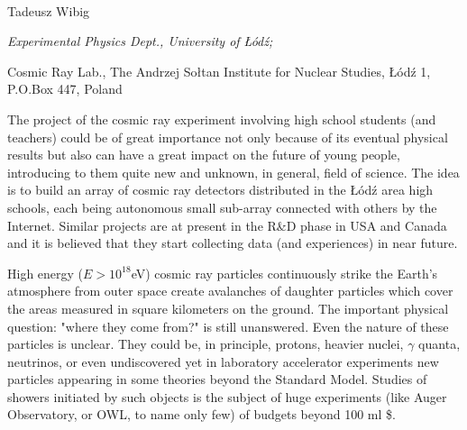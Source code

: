 \sloppy

\textheight 23cm
\textwidth 15cm
\leftmargin 4cm
\topmargin -1.5cm

\pagestyle{empty}

\begin{center}
 
\

\vspace{2cm}

{\huge Tadeusz Wibig}

 \vspace{1cm}
\noindent
{{\Large \it Experimental Physics Dept., University of \L \'{o}d\'{z}; 

\vspace{.3cm} \noindent
Cosmic Ray Lab.,  
The Andrzej So{\l }tan Institute for Nuclear Studies,  
{\L }\'{o}d\'{z} 1, P.O.Box 447, 
Poland}}
 
 
 
\vspace{1cm}

 \Large
\begin{minipage}{15cm}
The project of the cosmic ray experiment involving high school
students (and teachers) could be of great importance not only because of its
eventual physical results but also can have a great impact on
the future of young people, introducing to them quite new and
unknown, in general, field of science. The idea is to build an array of cosmic
ray detectors distributed in the \L \'{o}d\'{z} area high schools, each
being autonomous small sub-array connected with others by the Internet.
Similar projects are at present in the R\&D phase in USA and Canada and it is
believed that they start collecting data (and experiences) in near future.
\end{minipage}    
\end{center}

\newpage
\Large
High energy ($E>10^{18}$eV) cosmic ray particles continuously strike the
Earth's atmosphere from outer space create avalanches of daughter particles
which cover the areas measured in square kilometers on the ground. The
important physical question: "where they come from?" is still unanswered. Even
the nature of these particles is unclear. They could be, in principle, 
protons, heavier nuclei, $\gamma$ quanta, neutrinos, or even undiscovered yet
in laboratory accelerator experiments new particles appearing in some theories
beyond the Standard Model. Studies of showers initiated by such objects is the
subject of huge experiments (like Auger Observatory, or OWL, to name only few)
of budgets beyond 100 ml \$. 

